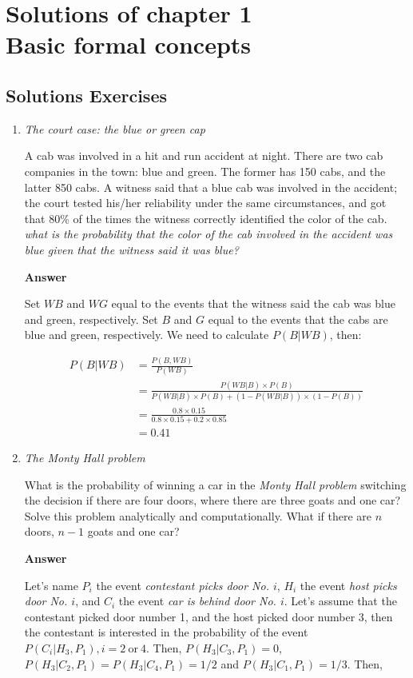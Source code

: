 \chapter{Solutions of chapter 1 \\
	Basic formal concepts}\label{chap1}
\section{Solutions Exercises}\label{sec11}
\begin{enumerate}[leftmargin=*]
\item \textit{The court case: the blue or green cap}
	
A cab was involved in a hit and run accident at night. There are two cab companies in the town: blue and green. The former has 150 cabs, and the latter 850 cabs. A witness said that a blue cab was involved in the accident; the court tested his/her reliability under the same circumstances, and got that 80\% of the times the witness correctly identified the color of the cab. \textit{what is the probability that the color of the cab involved in the accident was blue given that the witness said it was blue?}
	
\textbf{Answer}
	
Set $WB$ and $WG$ equal to the events that the witness said the cab was blue and green, respectively. Set $B$ and $G$ equal to the events that the cabs are blue and green, respectively. We need to calculate $P(B|WB)$, then:
	
\begin{align}
	P(B|WB)&=\frac{P(B,WB)}{P(WB)}\\
	&=\frac{P(WB|B)\times P(B)}{P(WB|B)\times P(B)+(1-P(WB|B))\times (1-P(B))}\nonumber\\
	&=\frac{0.8\times 0.15}{0.8\times 0.15+0.2\times 0.85}\nonumber\\
	&=0.41\nonumber
\end{align}
	
	
\item \textit{The Monty Hall problem}
	
What is the probability of winning a car in the \textit{Monty Hall problem} switching the decision if there are four doors, where there are three goats and one car? Solve this problem analytically and computationally.  What if there are $n$ doors, $n-1$ goats and one car?
	
\textbf{Answer}
	
Let's name $P_i$ the event \textit{contestant picks door No. $i$}, $H_i$ the event \textit{host picks door No. $i$}, and $C_i$ the event \textit{car is behind door No. $i$}. Let's assume that the contestant picked door number 1, and the host picked door number 3, then the contestant is interested in the probability of the event $P(C_i|H_3,P_1), i = 2 \ \text{or} \ 4$. Then, $P(H_3|C_3,P_1)=0$, $P(H_3|C_2,P_1)=P(H_3|C_4,P_1)=1/2$ and $P(H_3|C_1,P_1)=1/3$. Then,  
	

\end{enumerate}

